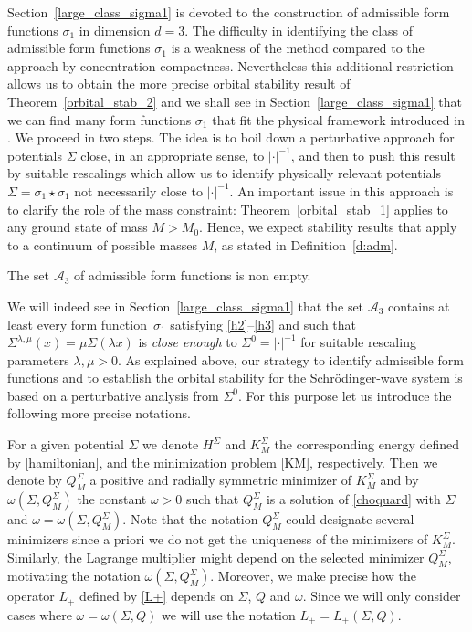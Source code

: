 Section~\ref{large_class_sigma1} is devoted to the construction of admissible form functions $\sigma_{1}$ in dimension $d=3$. The difficulty in identifying the class of admissible form functions $\sigma_{1}$ is a weakness of the method compared to the approach by concentration-compactness.
Nevertheless this additional restriction allows us to \hbox{obtain} the more precise orbital stability result of Theorem~\ref{orbital_stab_2} and we shall see in Section~\ref{large_class_sigma1} that we can find many form functions $\sigma_{1}$ that fit the physical framework introduced in \cite{BdB}.
We proceed in two steps. The idea is to boil down a perturbative approach for potentials $\Sigma$ close, in an appropriate sense, to $|\cdot|^{-1}$,
and then to push this result by suitable rescalings which allow us to identify physically relevant potentials $\Sigma=\sigma_1\star\sigma_1$ not necessarily close to $|\cdot|^{-1}$.
An important issue in this approach is to clarify the role of the mass constraint:
Theorem~\ref{orbital_stab_1}
applies to any ground state of mass $M>M_{0}$. Hence, we expect stability results that apply to a continuum of possible masses $M$, as stated in Definition~\ref{d:adm}.

\begin{proposition}\label{non_perturbative_L+}
The set $\mathscr{A}_{3}$ of admissible form functions is non empty.
\end{proposition}
We will indeed see in Section~\ref{large_class_sigma1} that the set $\mathscr{A}_{3}$ contains at least every form function~$\sigma_{1}$ satisfying \eqref{h2}--\eqref{h3} and such that $\Sigma^{\lambda,\mu}(x)=\mu\Sigma(\lambda x)$ is \emph{close enough} to $\Sigma^0=|\cdot|^{-1}$ for suitable rescaling parameters $\lambda,\mu>0$. As explained above, our strategy
to identify admissible form functions and to establish the orbital stability for the Schrödinger-wave system
is based on a perturbative analysis from $\Sigma^0$. For this purpose let us introduce the following more precise notations.

\begin{defin}\label{defKUpM}
For a given potential $\Sigma$ we denote $H^{\Sigma}$
and $K_{M}^{\Sigma}$ the corresponding energy defined by \eqref{hamiltonian}, and the minimization problem \eqref{KM}, respectively.
Then we denote by $Q_{M}^{\Sigma}$ a positive and radially symmetric minimizer of $K_{M}^{\Sigma}$ and by $\omega(\Sigma,Q_{M}^{\Sigma})$ the constant $\omega>0$ such that $Q_{M}^{\Sigma}$ is a solution of \eqref{choquard} with $\Sigma$ and $\omega=\omega(\Sigma,Q_{M}^{\Sigma})$. Note that the notation $Q_{M}^{\Sigma}$ could designate several minimizers since a priori we do not get the uniqueness of the minimizers of $K_{M}^{\Sigma}$.
Similarly, the Lagrange multiplier might depend on the selected minimizer $Q_{M}^{\Sigma}$, motivating the notation $\omega(\Sigma,Q_{M}^{\Sigma})$. Moreover, we make precise how the operator $L_{+}$ defined by \eqref{L+} depends on $\Sigma$, $Q$ and $\omega$. Since we will only consider cases where $\omega=\omega(\Sigma,Q)$ we will use the notation $L_{+}=L_{+}(\Sigma,Q)$.
\end{defin}

